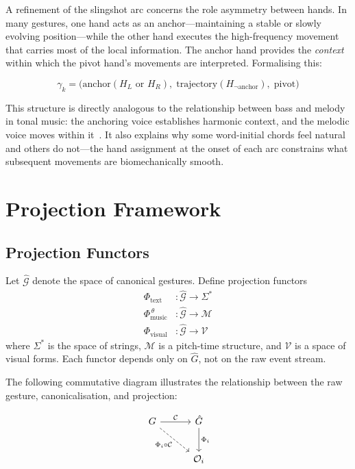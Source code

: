\documentclass[11pt, a4paper]{article}
\begin{document}
A refinement of the slingshot arc concerns the role asymmetry between
hands. In many gestures, one hand acts as an anchor---maintaining a
stable or slowly evolving position---while the other hand executes the
high-frequency movement that carries most of the local information. The
anchor hand provides the \emph{context} within which the pivot hand's
movements are interpreted. Formalising this:

\[
  \gamma_k = \bigl(\mathrm{anchor}(H_L \text{ or } H_R),\;
               \mathrm{trajectory}(H_{\neg\mathrm{anchor}}),\;
               \mathrm{pivot}\bigr)
\]

This structure is directly analogous to the relationship between bass and
melody in tonal music: the anchoring voice establishes harmonic context,
and the melodic voice moves within it~\cite{cox2016}. It also explains why some
word-initial chords feel natural and others do not---the hand assignment
at the onset of each arc constrains what subsequent movements are
biomechanically smooth.

\section{Projection Framework}

\subsection{Projection Functors}

Let $\hat{\mathcal{G}}$ denote the space of canonical gestures. Define
projection functors
\begin{align*}
  \Phi_{\mathrm{text}}   &: \hat{\mathcal{G}} \to \Sigma^* \\
  \Phi_{\mathrm{music}}^{\,\theta} &: \hat{\mathcal{G}} \to \mathcal{M} \\
  \Phi_{\mathrm{visual}} &: \hat{\mathcal{G}} \to \mathcal{V}
\end{align*}
where $\Sigma^*$ is the space of strings, $\mathcal{M}$ is a
pitch-time structure, and $\mathcal{V}$ is a space of visual forms.
Each functor depends only on $\hat{G}$, not on the raw event stream.

The following commutative diagram illustrates the relationship between
the raw gesture, canonicalisation, and projection:

\[
\begin{tikzcd}[column sep=3em, row sep=2.5em]
  G \arrow[r, "\mathcal{C}"] \arrow[dr, dashed, "\Phi_i \circ \mathcal{C}"']
    & \hat{G} \arrow[d, "\Phi_i"] \\
    & \mathcal{O}_i
\end{tikzcd}
\]
\end{document}
